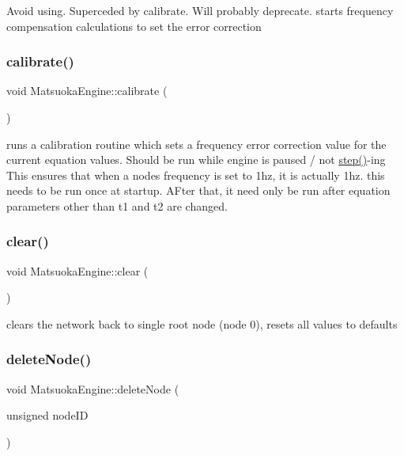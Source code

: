 Avoid using. Superceded by calibrate. Will probably deprecate. starts frequency compensation calculations to set the error correction \mbox{\label{classMatsuokaEngine_a68d6295dfa0d28e3bc9d743e763d6ee9}} 
\subsubsection{\texorpdfstring{calibrate()}{calibrate()}}
{\footnotesize\ttfamily void Matsuoka\+Engine\+::calibrate (\begin{DoxyParamCaption}{ }\end{DoxyParamCaption})}

runs a calibration routine which sets a frequency error correction value for the current equation values. Should be run while engine is paused / not \mbox{\hyperlink{classMatsuokaEngine_a4fa468dc0814f1ad92594f7a4d5abd00}{step()}}-\/ing This ensures that when a node\textquotesingle{}s frequency is set to 1hz, it is actually 1hz. this needs to be run once at startup. A\+Fter that, it need only be run after equation parameters other than t1 and t2 are changed. \mbox{\label{classMatsuokaEngine_a3bf65a238e682b78fee81cd13b49174d}} 
\subsubsection{\texorpdfstring{clear()}{clear()}}
{\footnotesize\ttfamily void Matsuoka\+Engine\+::clear (\begin{DoxyParamCaption}{ }\end{DoxyParamCaption})}



clears the network back to single root node (node 0), resets all values to defaults 

\mbox{\label{classMatsuokaEngine_a475f866cfa6cf0e4249483a4ea2d5816}} 
\subsubsection{\texorpdfstring{delete\+Node()}{deleteNode()}}
{\footnotesize\ttfamily void Matsuoka\+Engine\+::delete\+Node (\begin{DoxyParamCaption}\item[{unsigned}]{node\+ID }\end{DoxyParamCaption})}



